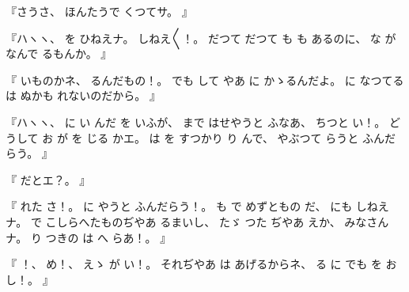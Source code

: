 %
『さうさ、
%
ほんたうで
くつてサ。
』

%
『ハヽヽ、
%
を
ひねえナ。
%
しねえ〳〵！。
%
だつて
だつて
も
も
あるのに、
%
な
がなんで
るもんか。
』

%
『
いものかネ、
%
るんだもの！。
%
でも
して
やあ
に
かゝるんだよ。
%
に
なつてる
は
ぬかも
れないのだから。
』

%
『ハヽヽ、
%
に
い
んだ
を
いふが、
%
まで
はせやうと
ふなあ、
%
ちつと
い！。
%
どうして
お
が
を
じる
かエ。
%
は
を
すつかり
り
んで、
やぶつて
らうと
ふんだらう。
』

%
『
だとエ？。
』

%
『
れた
さ！。
%
に
やうと
ふんだらう！。
%
も
で
めずともの
だ、
%
にも
しねえナ。
%
で
こしらへたものぢやあ
るまいし、
%
たゞ
つた
ぢやあ
えか、
%
みなさんナ。
%
り
つきの
は
へ
らあ！。
』

%
『
！、
%
め！、
%
えゝ
が
い！。
%
それぢやあ
は
あげるからネ、
%
る
に
でも
を
お
し！。
』
